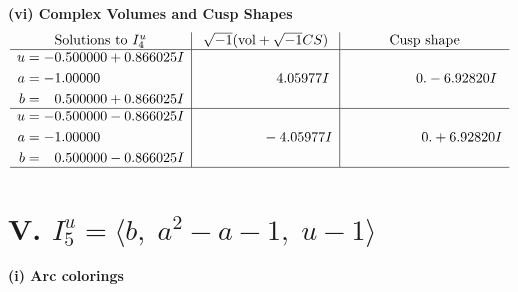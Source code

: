 \documentclass[1p]{elsarticle_modified}
\theoremstyle{definition}
\newcommand{\I}{\sqrt{-1}}
\begin{document}
\newpage\flushleft \textbf{(vi) Complex Volumes and Cusp Shapes}
$$\begin{array}{c|c|c}  
\text{Solutions to }I^u_{4}& \I (\text{vol} + \sqrt{-1}CS) & \text{Cusp shape}\\
 \hline 
\begin{aligned}
u &= -0.500000 + 0.866025 I \\
a &= -1.00000\phantom{ +0.000000I} \\
b &= \phantom{-}0.500000 + 0.866025 I\end{aligned}
 & \phantom{-0.000000 -}4.05977 I & \phantom{-0.000000 } 0. - 6.92820 I \\ \hline\begin{aligned}
u &= -0.500000 - 0.866025 I \\
a &= -1.00000\phantom{ +0.000000I} \\
b &= \phantom{-}0.500000 - 0.866025 I\end{aligned}
 & \phantom{-0.000000 } -4.05977 I & \phantom{-0.000000 -}0. + 6.92820 I\\
 \hline 
 \end{array}$$\newpage\newpage\renewcommand{\arraystretch}{1}
\centering \section*{V. $I^u_{5}= \langle b,\;a^2- a-1,\;u-1 \rangle$}
\flushleft \textbf{(i) Arc colorings}\\
\end{document}

